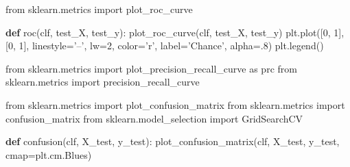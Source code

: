 \documentclass[]{article}
\newenvironment{Shaded}{}{}
\newcommand{\DecValTok}[1]{\textcolor[rgb]{0.25,0.63,0.44}{#1}}
\newcommand{\ImportTok}[1]{#1}
\newcommand{\KeywordTok}[1]{\textcolor[rgb]{0.00,0.44,0.13}{\textbf{#1}}}
\newcommand{\NormalTok}[1]{#1}
\newcommand{\OperatorTok}[1]{\textcolor[rgb]{0.40,0.40,0.40}{#1}}
\newcommand{\StringTok}[1]{\textcolor[rgb]{0.25,0.44,0.63}{#1}}
\begin{document}
\begin{Shaded}
\begin{Highlighting}[]
\ImportTok{from}\NormalTok{ sklearn.metrics }\ImportTok{import}\NormalTok{ plot_roc_curve}

\KeywordTok{def}\NormalTok{ roc(clf, test_X, test_y):}
\NormalTok{    plot_roc_curve(clf, test_X, test_y)}
\NormalTok{    plt.plot([}\DecValTok{0}\NormalTok{, }\DecValTok{1}\NormalTok{], [}\DecValTok{0}\NormalTok{, }\DecValTok{1}\NormalTok{], linestyle}\OperatorTok{=}\StringTok{'--'}\NormalTok{, lw}\OperatorTok{=}\DecValTok{2}\NormalTok{, color}\OperatorTok{=}\StringTok{'r'}\NormalTok{, label}\OperatorTok{=}\StringTok{'Chance'}\NormalTok{, alpha}\OperatorTok{=}\NormalTok{.}\DecValTok{8}\NormalTok{)}
\NormalTok{    plt.legend()}
\end{Highlighting}
\end{Shaded}

\begin{Shaded}
\begin{Highlighting}[]
\ImportTok{from}\NormalTok{ sklearn.metrics }\ImportTok{import}\NormalTok{ plot_precision_recall_curve }\ImportTok{as}\NormalTok{ prc}
\ImportTok{from}\NormalTok{ sklearn.metrics }\ImportTok{import}\NormalTok{ precision_recall_curve}
\end{Highlighting}
\end{Shaded}

\begin{Shaded}
\begin{Highlighting}[]
\ImportTok{from}\NormalTok{ sklearn.metrics }\ImportTok{import}\NormalTok{ plot_confusion_matrix}
\ImportTok{from}\NormalTok{ sklearn.metrics }\ImportTok{import}\NormalTok{ confusion_matrix}
\ImportTok{from}\NormalTok{ sklearn.model_selection }\ImportTok{import}\NormalTok{ GridSearchCV}

\KeywordTok{def}\NormalTok{ confusion(clf, X_test, y_test):}
\NormalTok{    plot_confusion_matrix(clf, X_test, y_test, cmap}\OperatorTok{=}\NormalTok{plt.cm.Blues)    }
                        
\end{Highlighting}
\end{Shaded}
\end{document}
